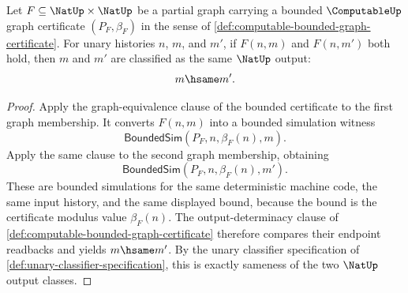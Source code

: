 \begin{theorem}
\label{thm:computable-bounded-graph-certificate-functional}
Let $F\subseteq\NatUp\times\NatUp$ be a partial graph carrying a bounded $\ComputableUp$ graph certificate $(P_F,\beta_F)$ in the sense of \autoref{def:computable-bounded-graph-certificate}. For unary histories $n$, $m$, and $m'$, if $F(n,m)$ and $F(n,m')$ both hold, then $m$ and $m'$ are classified as the same $\NatUp$ output:
$$
  m\hsame m'.
$$
\end{theorem}
\begin{proof}
Apply the graph-equivalence clause of the bounded certificate to the first graph membership. It converts $F(n,m)$ into a bounded simulation witness
$$
  \mathsf{BoundedSim}(P_F,n,\beta_F(n),m).
$$
Apply the same clause to the second graph membership, obtaining
$$
  \mathsf{BoundedSim}(P_F,n,\beta_F(n),m').
$$
These are bounded simulations for the same deterministic machine code, the same input history, and the same displayed bound, because the bound is the certificate modulus value $\beta_F(n)$. The output-determinacy clause of \autoref{def:computable-bounded-graph-certificate} therefore compares their endpoint readbacks and yields $m\hsame m'$. By the unary classifier specification of \autoref{def:unary-classifier-specification}, this is exactly sameness of the two $\NatUp$ output classes.
\end{proof}

